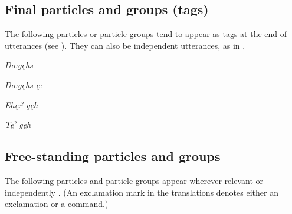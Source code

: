 \subsection*{Final particles and groups (tags)}
The following particles or particle groups tend to appear as tags at the end of utterances (see ). They can also be independent utterances, as in .

\ea
\label{ex:particleclauseorder4}

\ea \textit{Do:gęhs} 

\ex \textit{Do:gęhs ę:} 

\ex \textit{Ehę:ˀ gęh} 

\ex \textit{Tęˀ gęh} 
\z
\z 


\subsection*{Free-standing particles and groups}\label{Free-standing particles and groups}

The following particles and particle groups appear wherever relevant or independently . (An exclamation mark in the translations denotes either an exclamation or a command.)


\ea
\label{ex:particleclauseorder7}

